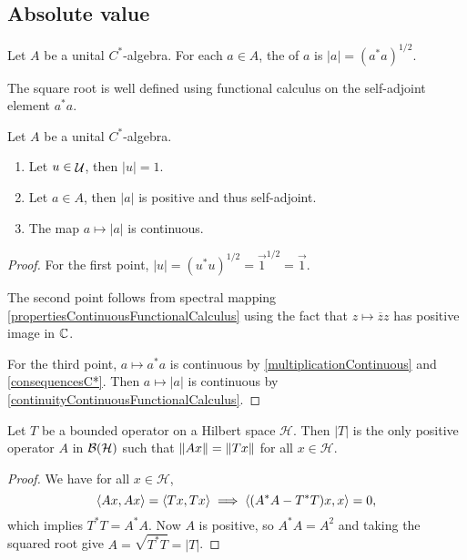 \subsection{Absolute value}
\begin{definition}
Let $A$ be a unital $C^*$-algebra. For each $a\in A$, the  of $a$ is $|a| = (a^*a)^{1/2}$.
\end{definition}
The square root is well defined using functional calculus on the self-adjoint element $a^*a$.

\begin{lemma} \label{propertiesAbsoluteValue}
Let $A$ be a unital $C^*$-algebra.
\begin{enumerate}
\item Let $u\in\mathop{\mathcal{U}}\nolimits$, then $|u| = 1$.
\item Let $a\in A$, then $|a|$ is positive and thus self-adjoint.
\item The map $a\mapsto |a|$ is continuous.
\end{enumerate}
\end{lemma}
\begin{proof}
For the first point, $|u| = (u^*u)^{1/2} = \vec{1}^{1/2} = \vec{1}$.

The second point follows from spectral mapping \ref{propertiesContinuousFunctionalCalculus} using the fact that $z\mapsto \overline{z}z$ has positive image in $\mathbb{C}$.

For the third point, $a\mapsto a^*a$ is continuous by \ref{multiplicationContinuous} and \ref{consequencesC*}. Then $a\mapsto |a|$ is continuous by \ref{continuityContinuousFunctionalCalculus}.
\end{proof}

\begin{lemma}
Let $T$ be a bounded operator on a Hilbert space $\mathcal{H}$. Then $|T|$ is the only positive operator $A$ in $\operatorname{\mathcal{B}}(\mathcal{H})$ such that $\lVert Ax\rVert = \lVert Tx\rVert$ for all $x\in\mathcal{H}$.
\end{lemma}
\begin{proof}
We have for all $x\in\mathcal{H}$,
\[ \left\langle Ax,Ax \right\rangle = \left\langle Tx,Tx \right\rangle \implies \left\langle (A^*A-T^*T)x,x \right\rangle=0, \]
which implies $T^*T = A^*A$. Now $A$ is positive, so $A^*A = A^2$ and taking the squared root give $A = \sqrt{T^*T} = |T|$.
\end{proof}


